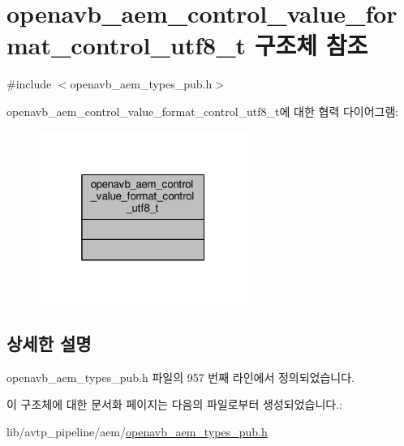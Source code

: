 \hypertarget{structopenavb__aem__control__value__format__control__utf8__t}{}\section{openavb\+\_\+aem\+\_\+control\+\_\+value\+\_\+format\+\_\+control\+\_\+utf8\+\_\+t 구조체 참조}
\label{structopenavb__aem__control__value__format__control__utf8__t}


{\ttfamily \#include $<$openavb\+\_\+aem\+\_\+types\+\_\+pub.\+h$>$}



openavb\+\_\+aem\+\_\+control\+\_\+value\+\_\+format\+\_\+control\+\_\+utf8\+\_\+t에 대한 협력 다이어그램\+:
\nopagebreak
\begin{figure}[H]
\begin{center}
\leavevmode
\includegraphics[width=193pt]{structopenavb__aem__control__value__format__control__utf8__t__coll__graph}
\end{center}
\end{figure}


\subsection{상세한 설명}


openavb\+\_\+aem\+\_\+types\+\_\+pub.\+h 파일의 957 번째 라인에서 정의되었습니다.



이 구조체에 대한 문서화 페이지는 다음의 파일로부터 생성되었습니다.\+:\begin{DoxyCompactItemize}
\item 
lib/avtp\+\_\+pipeline/aem/\hyperlink{openavb__aem__types__pub_8h}{openavb\+\_\+aem\+\_\+types\+\_\+pub.\+h}\end{DoxyCompactItemize}
